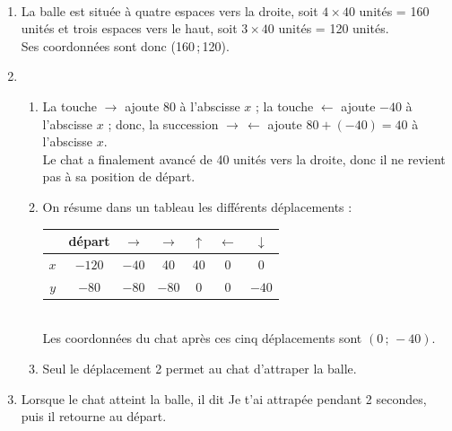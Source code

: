 \begin{corrige}
   \ \\ [-5mm]
   \begin{enumerate}
      \item La balle est située à quatre espaces vers la droite, soit $4\times40$ unités = 160 unités et trois espaces vers le haut, soit $3\times40$ unités = 120 unités. \\
      Ses coordonnées sont donc {\blue (160\,;\,120)}.
      \item \\
      \begin{enumerate}
         \item La touche $\to$ ajoute 80 à l'abscisse $x$ ; la touche $\gets$ ajoute $-40$ à l'abscisse $x$ ; donc, la succession $\to \, \gets$ ajoute $80+(-40) =40$ à l'abscisse $x$. \\
         Le chat a finalement \og avancé \fg{} de 40 unités vers la droite, donc {\blue il ne revient pas à sa position de départ}. 
         \item On résume dans un tableau les différents déplacements : \\ \medskip
            {
            \begin{tabular}{|*{7}{C{1}|}}
               \hline
               & départ & $\to$ & $\to$ & $\uparrow$ & $\gets$ & $\downarrow$ \\
               \hline
               $x$ & $-120$ & $-40$ & 40 & 40 & 0 & 0 \\
               \hline 
               $y$ & $-80$ & $-80$ & $-80$ & 0 & 0 & $-40$ \\
               \hline
            \end{tabular}} \\ \medskip
         Les coordonnées du chat après ces cinq déplacements sont {\blue $(0\,;\,-40)$}.
         \item Seul le {\blue déplacement 2} permet au chat d'attraper la balle.
      \end{enumerate}
      \setcounter{enumi}{2}
      \item Lorsque le chat atteint la balle, {\blue il dit \og Je t'ai attrapée \fg{} pendant 2 secondes}, puis il retourne au départ. 
   \end{enumerate}
\end{corrige}

\bigskip


